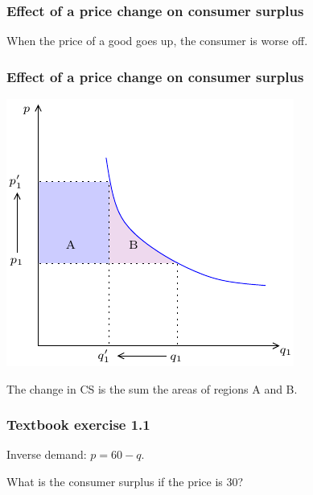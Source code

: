 \documentclass[xcolor=pdftex,dvipsnames]{beamer}
\begin{document}
\begin{frame}
\frametitle{Effect of a price change on consumer surplus}
When the price of a good goes up, the consumer is worse off. 

\bigskip
{}
\bigskip


\end{frame}




\begin{frame}
\frametitle{Effect of a price change on consumer surplus}
\begin{center}
\includegraphics{pics/ChangeInPrice}\end{center}
The change in CS is the sum the areas of regions  A and B.
\bigskip


\bigskip
{}
\end{frame}

\begin{frame}
\frametitle{Textbook exercise 1.1}

Inverse demand: $p=60-q$.

What is the consumer surplus if the price is 30?
\bigskip

\bigskip


\end{frame}
\end{document}
